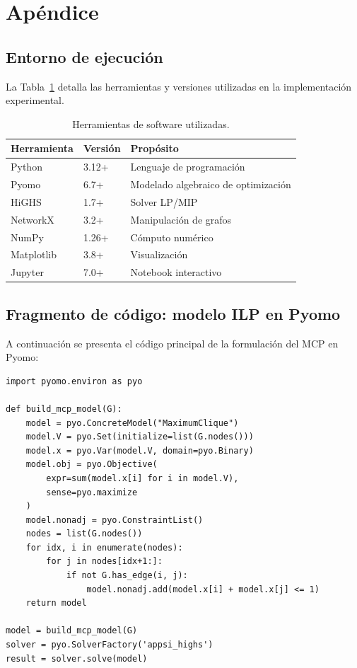\section{Apéndice}

\subsection{Entorno de ejecución}

La Tabla~\ref{tab:entorno} detalla las herramientas y versiones utilizadas en la implementación experimental.

\begin{table}[H]
\centering
\caption{Herramientas de software utilizadas.}
\label{tab:entorno}
\begin{tabular}{lll}
\hline
\textbf{Herramienta} & \textbf{Versión} & \textbf{Propósito} \\
\hline
Python \parencite{python3} & 3.12+ & Lenguaje de programación \\
Pyomo \parencite{pyomo2021} & 6.7+ & Modelado algebraico de optimización \\
HiGHS \parencite{highs2024} & 1.7+ & Solver LP/MIP \\
NetworkX \parencite{networkx2008} & 3.2+ & Manipulación de grafos \\
NumPy \parencite{numpy2020} & 1.26+ & Cómputo numérico \\
Matplotlib \parencite{matplotlib2007} & 3.8+ & Visualización \\
Jupyter \parencite{jupyter2016} & 7.0+ & Notebook interactivo \\
\hline
\end{tabular}
\end{table}

\subsection{Fragmento de código: modelo ILP en Pyomo}

A continuación se presenta el código principal de la formulación del MCP en Pyomo:

{\small
\begin{verbatim}
import pyomo.environ as pyo

def build_mcp_model(G):
    model = pyo.ConcreteModel("MaximumClique")
    model.V = pyo.Set(initialize=list(G.nodes()))
    model.x = pyo.Var(model.V, domain=pyo.Binary)
    model.obj = pyo.Objective(
        expr=sum(model.x[i] for i in model.V),
        sense=pyo.maximize
    )
    model.nonadj = pyo.ConstraintList()
    nodes = list(G.nodes())
    for idx, i in enumerate(nodes):
        for j in nodes[idx+1:]:
            if not G.has_edge(i, j):
                model.nonadj.add(model.x[i] + model.x[j] <= 1)
    return model

model = build_mcp_model(G)
solver = pyo.SolverFactory('appsi_highs')
result = solver.solve(model)
\end{verbatim}
}

